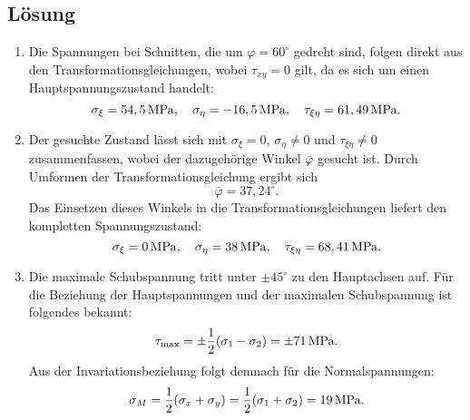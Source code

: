 \documentclass{exercise}
\begin{document}
    \subsection*{Lösung}
    \begin{enumerate}
        \item Die Spannungen bei Schnitten, die um \(\varphi = 60^\circ\) gedreht sind, folgen direkt aus den Transformationsgleichungen, wobei \(\tau_{xy} = 0\) gilt, da es sich um einen Hauptspannungszustand handelt:
        \[
            \sigma_\xi = 54,5\,\si{\mega\pascal}, \quad \sigma_\eta = -16,5\,\si{\mega\pascal}, \quad \tau_{\xi\eta} = 61,49\,\si{\mega\pascal}.
        \]
        \item Der gesuchte Zustand lässt sich mit \(\sigma_\xi = 0\), \(\sigma_\eta \ne 0\) und \(\tau_{\xi\eta} \ne 0\) zusammenfassen, wobei der dazugehörige Winkel \(\bar{\varphi}\) gesucht ist.
        Durch Umformen der Transformationsgleichung ergibt sich
        \[
            \bar{\varphi} = 37,24^\circ.
        \]
        Das Einsetzen dieses Winkels in die Transformationsgleichungen liefert den kompletten Spannungszustand:
        \[
            \sigma_\xi = 0\,\si{\mega\pascal}, \quad \sigma_\eta = 38\,\si{\mega\pascal}, \quad \tau_{\xi\eta} = 68,41\,\si{\mega\pascal}.
        \]
        \item Die maximale Schubspannung tritt unter \(\pm 45^\circ\) zu den Hauptachsen auf.
        Für die Beziehung der Hauptspannungen und der maximalen Schubspannung ist folgendes bekannt:
        \[
            \tau_{\text{max}} = \pm\frac{1}{2}\parentheses*{\sigma_1 - \sigma_2} = \pm 71\sis{\mega\pascal}.
        \]
        Aus der Invariationsbeziehung folgt demnach für die Normalspannungen:
        \[
            \sigma_M = \frac{1}{2}\parentheses*{\sigma_x + \sigma_y} = \frac{1}{2}\parentheses*{\sigma_1 + \sigma_2} = 19\sis{\mega\pascal}.
        \]
    \end{enumerate}
\end{document}
